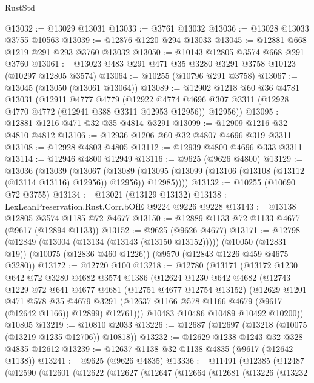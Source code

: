 \begin{lexlean}{RustStd}
\begin{coremodule}
{\begin{coremodule}
{{{{{{{{{{{{{{{{{{{{{{{{{{{{{{{{{@13032 := @13029 @13031
@13033 := @3761 @13032
@13036 := @13028 @13033 @3755 @10563
@13039 := @12876 @1220 @294 @13033
@13045 := @12881 @668 @1219 @291 @293 @3760 @13032
@13050 := @10143 @12805 @3574 @668 @291 @3760
@13061 := @13023 @483 @291 @471 @35 @3280 @3291 @3758 @10123 (@10297 @12805 @3574)
@13064 := @10255 (@10796 @291 @3758)
@13067 := @13045 (@13050 (@13061 @13064))
@13089 := @12902
    @1218
    @60
    @36
    @4781
    @13031
    (@12911
      @4777
      @4779
      (@12922 @4774 @4696 @307 @3311 (@12928 @4770 @4772 (@12941 @388 @3311 @12953 @12956)) @12956))
@13095 := @12881 @1216 @471 @32 @35 @4814 @3291
@13099 := @12909 @1216 @32 @4810 @4812
@13106 := @12936 @1206 @60 @32 @4807 @4696 @319 @3311
@13108 := @12928 @4803 @4805
@13112 := @12939 @4800 @4696 @333 @3311
@13114 := @12946 @4800 @12949
@13116 := @9625 (@9626 @4800)
@13129 := @13036
    (@13039
      (@13067
        (@13089 (@13095 (@13099 (@13106 (@13108 (@13112 (@13114 @13116) @12956)) @12956)) @12985))))
@13132 := @10255 (@10690 @72 @3755)
@13134 := @13021 (@13129 @13132)
@13138 := LexLeanPreservation.Rust.Corr.bOfE @9224 @9226 @9228
@13143 := @13138 @12805 @3574 @1185 @72 @4677
@13150 := @12889 @1133 @72 @1133 @4677 (@9617 (@12894 @1133))
@13152 := @9625 (@9626 @4677)
@13171 := @12798
    (@12849 (@13004 (@13134 (@13143 (@13150 @13152)))))
    (@10050 (@12831 @19))
    (@10075 (@12836 @460 @1226))
    (@9570 (@12843 @1226 @459 @4675 @3280))
@13172 := @12720 @100
@13218 := @12780
    (@13171
      (@13172
        @1230
        @642
        @72
        @3280
        @4682
        @3574
        @1386
        (@12624
          @1230
          @642
          @4682
          (@12743
            @1229
            @72
            @641
            @4677
            @4681
            (@12751 @4677 @12754 @13152)
            (@12629
              @1201
              @471
              @578
              @35
              @4679
              @3291
              (@12637 @1166 @578 @1166 @4679 (@9617 (@12642 @1166)) @12899)
              @12761)))
        @10483
        @10486
        @10489
        @10492
        @10200))
    @10805
@13219 := @10810 @2033
@13226 := @12687 (@12697 (@13218 (@10075 (@13219 @1235 @12706)) @10818))
@13232 := @12629 @1238 @1243 @32 @328 @4835 @12612
@13239 := @12637 @1138 @32 @1138 @4835 (@9617 (@12642 @1138))
@13241 := @9625 (@9626 @4835)
@13336 := @11491
    (@12385
      (@12487
        (@12590
          (@12601
            (@12622
              (@12627
                (@12647
                  (@12664
                    (@12681
                      (@13226
                        (@13232
}}}}}}}}}}}}}}}}}}}}}}}}}}}}}}}}}
\end{coremodule}}
\end{coremodule}
\end{lexlean}

